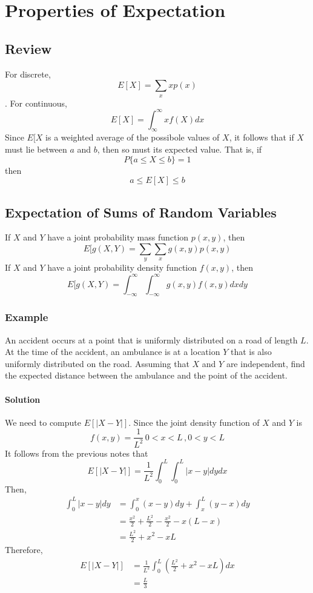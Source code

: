 \setcounter{chapter}{6}
\chapter{Properties of Expectation}
\section{Review}
For discrete, \[E[X] = \sum_x xp(x)\]. For continuous, \[E[X] = \int^\infty_{\infty} xf(X) dx\]
Since $E[X$ is a weighted average of the possibole values of $X$, it follows that if $X$ must lie between $a$ and $b$, then so must its expected value. That is, if \[P\{a\leq X\leq b\} = 1\] then \[a\leq E[X]\leq b\]
\section{Expectation of Sums of Random Variables}
If $X$ and $Y$ have a joint probability mass function $p(x,y)$, then \[E[g(X,Y) = \sum_y\sum_x g(x,y)p(x,y)\]
If $X$ and $Y$ have a joint probability density function $f(x,y)$, then \[E[g(X,Y) = \int^\infty_{-\infty} \int^\infty_{-\infty} g(x,y)f(x,y) dx dy\]
\subsection*{Example}
An accident occurs at a point that is uniformly distributed on a road of length $L$. At the time of the accident, an ambulance is at a location $Y$ that is also uniformly distributed on the road. Assuming that $X$ and $Y$ are independent, find the
expected distance between the ambulance and the point of the accident.
\subsubsection*{Solution}
We need to compute $E[|X-Y|]$. Since the joint density function of $X$ and $Y$ is \[f(x,y) = \frac{1}{L^2}\, 0 < x < L\, , 0 < y < L\]
It follows from the previous notes that \[E[|X - Y|] = \frac{1}{L^2}\int^L_0 \int^L_0 |x - y| dy dx\]
Then, \begin{equation*}
    \begin{split}
        \int^L_0 |x - y| dy &= \int^x_0 (x - y) dy + \int^L_x (y - x) dy\\
        &= \frac{x^2}{2} + \frac{L^2}{2} - \frac{x^2}{2} - x(L - x)\\
        &= \frac{L^2}{2} + x^2 - xL
    \end{split}
\end{equation*}
Therefore, \begin{equation*}
    \begin{split}
        E[|X - Y|] &= \frac{1}{L^2}\int^L_0 (\frac{L^2}{2} + x^2 - xL) dx\\
        &= \frac{L}{3}
    \end{split}
\end{equation*}
